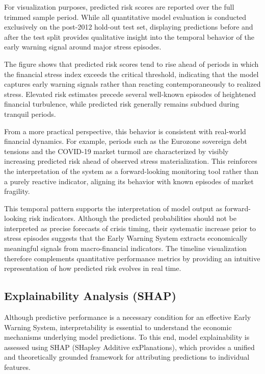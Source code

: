 \documentclass[11pt,a4paper]{article}
\begin{document}
For visualization purposes, predicted risk scores are reported over the full trimmed sample period. While all quantitative model evaluation is conducted exclusively on the post-2012 hold-out test set, displaying predictions before and after the test split provides qualitative insight into the temporal behavior of the early warning signal around major stress episodes.

The figure shows that predicted risk scores tend to rise ahead of periods in which the financial stress index exceeds the critical threshold, indicating that the model captures early warning signals rather than reacting contemporaneously to realized stress. Elevated risk estimates precede several well-known episodes of heightened financial turbulence, while predicted risk generally remains subdued during tranquil periods.

From a more practical perspective, this behavior is consistent with real-world financial dynamics. For example, periods such as the Eurozone sovereign debt tensions and the COVID-19 market turmoil are characterized by visibly increasing predicted risk ahead of observed stress materialization. This reinforces the interpretation of the system as a forward-looking monitoring tool rather than a purely reactive indicator, aligning its behavior with known episodes of market fragility.

This temporal pattern supports the interpretation of model output as forward-looking risk indicators. Although the predicted probabilities should not be interpreted as precise forecasts of crisis timing, their systematic increase prior to stress episodes suggests that the Early Warning System extracts economically meaningful signals from macro-financial indicators. The timeline visualization therefore complements quantitative performance metrics by providing an intuitive representation of how predicted risk evolves in real time.

\subsection{Explainability Analysis (SHAP)}
\label{subsec:shap_results}

Although predictive performance is a necessary condition for an effective Early Warning System, interpretability is essential to understand the economic mechanisms underlying model predictions. To this end, model explainability is assessed using SHAP (SHapley Additive exPlanations), which provides a unified and theoretically grounded framework for attributing predictions to individual features.
\end{document}
